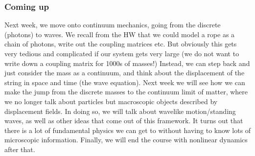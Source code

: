 \documentclass[../PHYS306Notes.tex]{subfiles}
\begin{document}
\subsubsection{Coming up}
Next week, we move onto continuum mechanics, going from the discrete (photons) to waves. We recall from the HW that we could model a rope as a chain of photons, write out the coupling matrices etc. But obviously this gets very tedious and complicated if our system gets very large (we do not want to write down a coupling matrix for 1000s of masses!) Instead, we can step back and just consider the mass as a continuum, and think about the displacement of the string in space and time (the wave equation). Next week we will see how we can make the jump from the discrete masses to the continuum limit of matter, where we no longer talk about particles but macroscopic objects described by displacement fields. In doing so, we will talk about wavelike motion/standing waves, as well as other ideas that come out of this framework. It turns out that there is a lot of fundamental physics we can get to without having to know lots of microscopic information. Finally, we will end the course with nonlinear dynamics after that.
\end{document}
